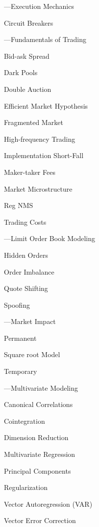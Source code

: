 \begin{minipage}{0.40\textwidth}
\noindent ---Execution Mechanics
	\begin{flushright}
	Circuit Breakers	
	\end{flushright}


\noindent ---Fundamentals of Trading 
	\begin{flushright}
	Bid-ask Spread \par
	Dark Pools \par
	Double Auction \par
	Efficient Market Hypothesis \par
	Fragmented Market \par
	High-frequency Trading \par
	Implementation Short-Fall \par
	Maker-taker Fees \par
	Market Microstructure \par
	Reg NMS \par
	Trading Costs
	\end{flushright}


\noindent ---Limit Order Book Modeling
	\begin{flushright}
	Hidden Orders \par
	Order Imbalance \par
	Quote Shifting \par
	Spoofing
	\end{flushright}


\noindent ---Market Impact
	\begin{flushright}
	Permanent \par
	Square root Model \par
	Temporary
	\end{flushright}


\noindent ---Multivariate Modeling
	\begin{flushright}
	Canonical Correlations \par
	Cointegration \par
	Dimension Reduction \par
	Multivariate Regression \par
	Principal Components \par
	Regularization \par
	Vector Autoregression (VAR) \par
	Vector Error Correction
	\end{flushright}

\vfill
\end{minipage} \newpage

